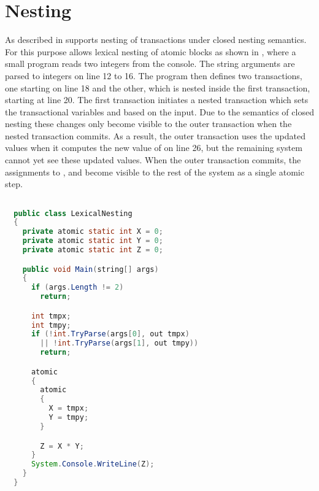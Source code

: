 \section{Nesting}\label{sec:nesting_design}
As described in  \stmnamesp supports nesting of transactions under closed nesting semantics. For this purpose \stmnamesp allows lexical nesting of atomic blocks as shown in , where a small program reads two integers from the console. The string arguments are parsed to integers on line 12 to 16. The program then defines two transactions, one starting on line 18 and the other, which is nested inside the first transaction, starting at line 20. The first transaction initiates a nested transaction which sets the transactional variables  and  based on the input. Due to the semantics of closed nesting these changes only become visible to the outer transaction when the nested transaction commits. As a result, the outer transaction uses the updated values when it computes the new value of  on line 26, but the remaining system cannot yet see these updated values. When the outer transaction commits, the assignments to ,  and  become visible to the rest of the system as a single atomic step.

\begin{lstlisting}[label=lst:stm_syntax_lexical_nesting,
 caption={Lexical Nesting},
 language=Java, 
 showspaces=false,
 showtabs=false,
 breaklines=true,
 showstringspaces=false,
 breakatwhitespace=true,
 commentstyle=\color{greencomments},
 keywordstyle=\color{bluekeywords},
 stringstyle=\color{redstrings},
 morekeywords={atomic, retry, orelse, var, get, set, using}]  % Start your code-block

  public class LexicalNesting
  {
    private atomic static int X = 0;
    private atomic static int Y = 0;
    private atomic static int Z = 0;

    public void Main(string[] args)
    {
      if (args.Length != 2)
        return;

      int tmpx;
      int tmpy;
      if (!int.TryParse(args[0], out tmpx)
        || !int.TryParse(args[1], out tmpy))
        return;

      atomic
      {
        atomic
        {
          X = tmpx;
          Y = tmpy;
        }

        Z = X * Y;
      }
      System.Console.WriteLine(Z);
    }
  }
\end{lstlisting}

